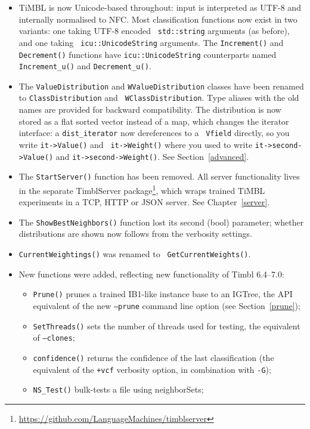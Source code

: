 \documentclass{report}
\begin{document}
\begin{itemize}
\item TiMBL is now Unicode-based throughout: input is interpreted as
  UTF-8 and internally normalised to NFC. Most classification
  functions now exist in two variants: one taking UTF-8 encoded {\tt
    std::string} arguments (as before), and one taking {\tt
    icu::UnicodeString} arguments. The {\tt Increment()} and {\tt
    Decrement()} functions have {\tt icu::UnicodeString} counterparts
  named {\tt Increment\_u()} and {\tt Decrement\_u()}.
\item The {\tt ValueDistribution} and {\tt WValueDistribution}
  classes have been renamed to {\tt ClassDistribution} and {\tt
    WClassDistribution}. Type aliases with the old names are provided
  for backward compatibility. The distribution is now stored as a
  flat sorted vector instead of a map, which changes the iterator
  interface: a {\tt dist\_iterator} now dereferences to a {\tt
    Vfield} directly, so you write {\tt it->Value()} and {\tt
    it->Weight()} where you used to write {\tt it->second->Value()}
  and {\tt it->second->Weight()}. See Section~\ref{advanced}.
\item The {\tt StartServer()} function has been removed. All server
  functionality lives in the separate TimblServer
  package\footnote{\url{https://github.com/LanguageMachines/timblserver}},
  which wraps trained TiMBL experiments in a TCP, HTTP or JSON
  server. See Chapter~\ref{server}.
\item The {\tt ShowBestNeighbors()} function lost its second (bool)
  parameter; whether distributions are shown now follows from the
  verbosity settings.
\item {\tt CurrentWeightings()} was renamed to {\tt
    GetCurrentWeights()}.
\item New functions were added, reflecting new functionality of
  Timbl 6.4--7.0:
  \begin{itemize}
  \item {\tt Prune()} prunes a trained IB1-like instance base to an
    IGTree, the API equivalent of the new {\tt --prune} command line
    option (see Section~\ref{prune});
  \item {\tt SetThreads()} sets the number of threads used for
    testing, the equivalent of {\tt --clones};
  \item {\tt confidence()} returns the confidence of the last
    classification (the equivalent of the {\tt +vcf} verbosity
    option, in combination with {\tt -G});
  \item {\tt NS\_Test()} bulk-tests a file using neighborSets;

\end{itemize}
\end{itemize}
\end{document}
